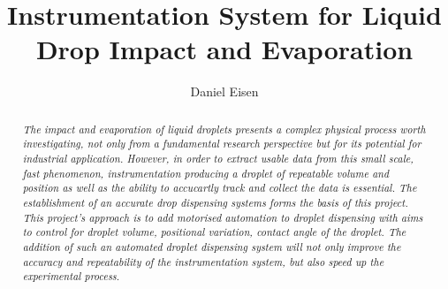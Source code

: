 \documentclass[11pt
              , a4paper
              , oneside
              ]{report}
\title{Instrumentation System for Liquid Drop Impact and Evaporation}
\author{Daniel Eisen}
\date{}
\begin{document}



\begin{abstract}
    
    \textit{The impact and evaporation of liquid droplets presents a complex physical process worth investigating, not only from a fundamental research perspective but for its potential for industrial application. However, in order to extract usable data from this small scale, fast phenomenon, instrumentation producing a droplet of repeatable volume and position as well as the ability to accucartly track and collect the data is essential. The establishment of an accurate drop dispensing systems forms the basis of this project. This project's approach is to add motorised automation to droplet dispensing with aims to control for droplet volume, positional variation, contact angle of the droplet.
    The addition of such an automated droplet dispensing system will not only improve the accuracy and repeatability of the instrumentation system, but also speed up the experimental process.} 

\end{abstract}


\maketitle
\tableofcontents


\mainmatter











\backmatter




\end{document}
